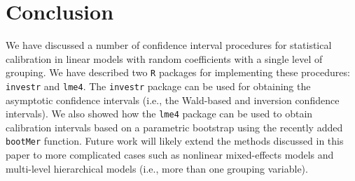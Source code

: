 \documentclass{article}\usepackage[]{graphicx}\usepackage[]{color}
\begin{document}
\section{Conclusion}

We have discussed a number of confidence interval procedures for statistical calibration in linear models with random coefficients with a single level of grouping.  We have described two \texttt{R} packages for implementing these procedures: \texttt{investr} and \texttt{lme4}.  The \texttt{investr} package can be used for obtaining the asymptotic confidence intervals (i.e., the Wald-based and inversion confidence intervals).  We also showed how the \texttt{lme4} package can be used to obtain calibration intervals based on a parametric bootstrap using the recently added \texttt{bootMer} function.  Future work will likely extend the methods discussed in this paper to more complicated cases such as nonlinear mixed-effects models and multi-level hierarchical models (i.e., more than one grouping variable).




\end{document}
